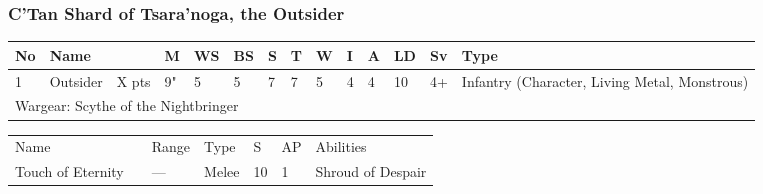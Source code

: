 \newpage
\subsubsection{C'Tan Shard of Tsara'noga, the Outsider}

\noindent
\begin{tabular}{||m{10pt} m{90pt} m{30pt} m{11pt} m{11pt} m{11pt} m{11pt} m{11pt} m{11pt} m{11pt} m{11pt} m{11pt} m{11pt} m{135pt}||}
	\hline
	No & Name & & M & WS & BS & S & T & W & I & A & LD & Sv & Type \\
	\hline
	1 & Outsider & X pts & 9" & 5 & 5 & 7 & 7 & 5 & 4 & 4 & 10 & 4+ & Infantry (Character, Living Metal, Monstrous)\\
	\hline
	\hline
	\multicolumn{14}{||Z{532 pt}||}{Wargear: Scythe of the Nightbringer}\\
	\hline
\end{tabular}

\noindent
\begin{tabular}{||m{140pt} m{0pt} m{31pt} m{55pt} m{12pt} m{12pt} m{210pt}||}
	\hline
	Name & & Range & Type & S & AP & Abilities \\
	Touch of Eternity & & — & Melee & 10 & 1 & Shroud of Despair \\
	\hline	
	\hline
\end{tabular}

